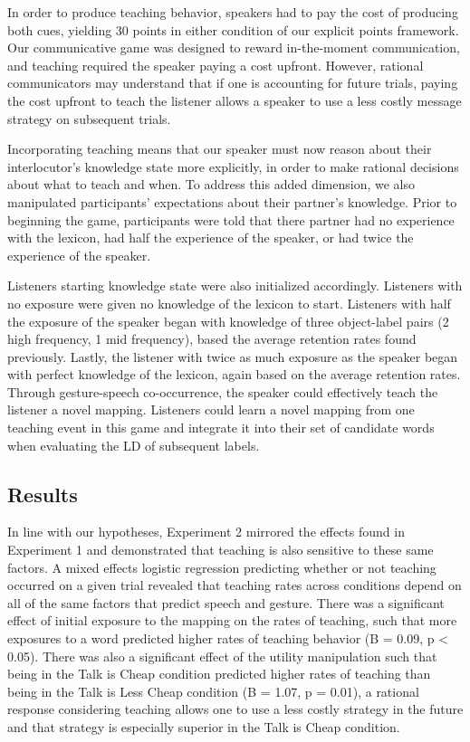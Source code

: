 \documentclass[10pt, letterpaper]{article}
\begin{document}
In order to produce teaching behavior, speakers had to pay the cost of
producing both cues, yielding 30 points in either condition of our
explicit points framework. Our communicative game was designed to reward
in-the-moment communication, and teaching required the speaker paying a
cost upfront. However, rational communicators may understand that if one
is accounting for future trials, paying the cost upfront to teach the
listener allows a speaker to use a less costly message strategy on
subsequent trials.

Incorporating teaching means that our speaker must now reason about
their interlocutor's knowledge state more explicitly, in order to make
rational decisions about what to teach and when. To address this added
dimension, we also manipulated participants' expectations about their
partner's knowledge. Prior to beginning the game, participants were told
that there partner had no experience with the lexicon, had half the
experience of the speaker, or had twice the experience of the speaker.

Listeners starting knowledge state were also initialized accordingly.
Listeners with no exposure were given no knowledge of the lexicon to
start. Listeners with half the exposure of the speaker began with
knowledge of three object-label pairs (2 high frequency, 1 mid
frequency), based the average retention rates found previously. Lastly,
the listener with twice as much exposure as the speaker began with
perfect knowledge of the lexicon, again based on the average retention
rates. Through gesture-speech co-occurrence, the speaker could
effectively teach the listener a novel mapping. Listeners could learn a
novel mapping from one teaching event in this game and integrate it into
their set of candidate words when evaluating the LD of subsequent
labels.

\subsection{Results}\label{results-1}

In line with our hypotheses, Experiment 2 mirrored the effects found in
Experiment 1 and demonstrated that teaching is also sensitive to these
same factors. A mixed effects logistic regression predicting whether or
not teaching occurred on a given trial revealed that teaching rates
across conditions depend on all of the same factors that predict speech
and gesture. There was a significant effect of initial exposure to the
mapping on the rates of teaching, such that more exposures to a word
predicted higher rates of teaching behavior (B = 0.09, p \textless{}
0.05). There was also a significant effect of the utility manipulation
such that being in the Talk is Cheap condition predicted higher rates of
teaching than being in the Talk is Less Cheap condition (B = 1.07, p =
0.01), a rational response considering teaching allows one to use a less
costly strategy in the future and that strategy is especially superior
in the Talk is Cheap condition.
\end{document}
